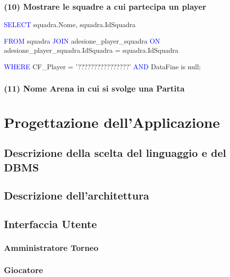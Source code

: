 \documentclass[a4paper,12pt]{report}
\begin{document}
\subsection*{(10) Mostrare le squadre a cui partecipa un player}
\textcolor{blue}{SELECT} squadra.Nome, squadra.IdSquadra 

\noindent \textcolor{blue}{FROM} squadra \textcolor{blue}{JOIN} adesione\_player\_squadra \textcolor{blue}{ON} adesione\_player\_squadra.IdSquadra = squadra.IdSquadra 

\noindent \textcolor{blue}{WHERE} CF\_Player = '????????????????' \textcolor{blue}{AND} DataFine is null;
\subsection*{(11) Nome Arena in cui si svolge una Partita}

\chapter{Progettazione dell'Applicazione}
\section{Descrizione della scelta del linguaggio e del DBMS}
\section{Descrizione dell'architettura}
\section{Interfaccia Utente}
\subsection{Amministratore Torneo}
\subsection{Giocatore}
\end{document}
